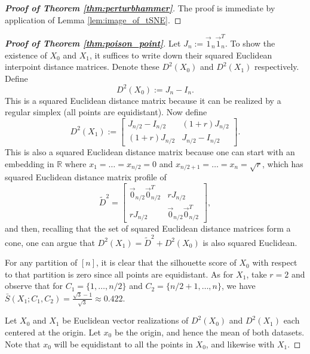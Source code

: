 \Perturbhammer*
\begin{proof}[\textbf{Proof of Theorem \ref{thm:perturbhammer}}]
    The proof is immediate by application of Lemma \ref{lem:image_of_tSNE}.
\end{proof}

\PoisonPoint*
\begin{proof}[\textbf{Proof of Theorem \ref{thm:poison_point}}]
Let \(J_n := \vec{1}_n \vec{1}_n^T\). To show the existence of \(X_0\) and \(X_1\), it suffices to write down their squared Euclidean interpoint distance matrices. Denote these \(D^2(X_0)\) and \(D^2(X_1)\) respectively. Define
   \[D^2(X_0) := J_n - I_n.\]
   This is a squared Euclidean distance matrix because it can be realized by a regular simplex (all points are equidistant). Now define
   \[D^2(X_1) := \begin{bmatrix}
       J_{n/2} - I_{n/2} & (1+r)  J_{n/2}   \\
       (1+r) J_{n/2}  &  J_{n/2} - I_{n/2}  
   \end{bmatrix}.\]
   This is also a squared Euclidean distance matrix because one can start with an embedding in \(\mathbb{R}\) where \(x_1 = \dots = x_{n/2} = 0\) and \(x_{n/2+1} = \dots = x_{n} = \sqrt{r}\), which has squared Euclidean distance matrix profile of
   \[\tilde D^2 = \begin{bmatrix}
       \vec{0}_{n/2}\vec{0}_{n/2}^T &  r  J_{n/2} \\
       r  J_{n/2}  &   \vec{0}_{n/2}\vec{0}_{n/2}^T 
   \end{bmatrix},\] 
   and then, recalling that the set of squared Euclidean distance matrices form a cone, one can argue that \(D^2(X_1) = \tilde D^2 + D^2(X_0)\) is also squared Euclidean.

   For any partition of \([n]\), it is clear that the silhouette score of \(X_0\) with respect to that partition is zero since all points are equidistant. As for \(X_1\), take \(r=2\) and observe that for \(C_1 = \{1,\dots, n/2\}\) and \(C_2 = \{n/2+1,\dots, n\}\), we have \(\bar{S}(X_1; C_1, C_2) = \frac{\sqrt{3} - 1}{\sqrt{3}} \approx 0.422.\)

Let \(X_0\) and \(X_1\) be Euclidean vector realizations of \(D^2(X_0)\) and \(D^2(X_1)\) each centered at the origin. Let \(x_0\) be the origin, and hence the mean of both datasets. Note that \(x_0\) will be equidistant to all the points in \(X_0\), and likewise with \(X_1\). 

\end{proof}
